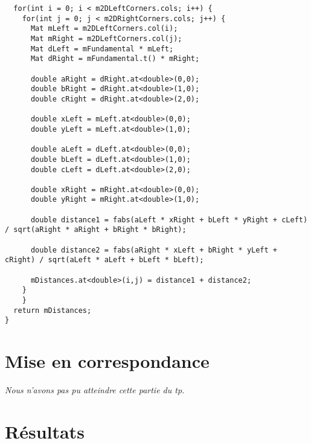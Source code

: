 \documentclass[a4paper]{article}
\begin{document}
\begin{itemize}
\begin{lstlisting}
  for(int i = 0; i < m2DLeftCorners.cols; i++) {
    for(int j = 0; j < m2DRightCorners.cols; j++) {
      Mat mLeft = m2DLeftCorners.col(i);
      Mat mRight = m2DLeftCorners.col(j);
      Mat dLeft = mFundamental * mLeft;
      Mat dRight = mFundamental.t() * mRight;

      double aRight = dRight.at<double>(0,0);
      double bRight = dRight.at<double>(1,0);
      double cRight = dRight.at<double>(2,0);

      double xLeft = mLeft.at<double>(0,0);
      double yLeft = mLeft.at<double>(1,0);

      double aLeft = dLeft.at<double>(0,0);
      double bLeft = dLeft.at<double>(1,0);
      double cLeft = dLeft.at<double>(2,0);

      double xRight = mRight.at<double>(0,0);
      double yRight = mRight.at<double>(1,0);

      double distance1 = fabs(aLeft * xRight + bLeft * yRight + cLeft) / sqrt(aRight * aRight + bRight * bRight);

      double distance2 = fabs(aRight * xLeft + bRight * yLeft + cRight) / sqrt(aLeft * aLeft + bLeft * bLeft);

      mDistances.at<double>(i,j) = distance1 + distance2;
    }
    }
  return mDistances;
}
\end{lstlisting}

\clearpage

\section{Mise en correspondance}

{\em Nous n'avons pas pu atteindre cette partie du tp.}

\clearpage

\section{Résultats}

\clearpage


\end{itemize}
\end{document}

